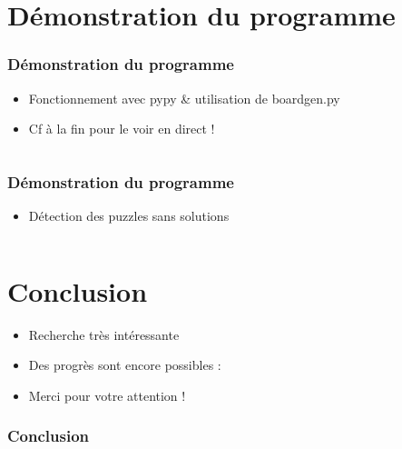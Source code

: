 \documentclass[12pt]{beamer}
\begin{document}
\section[]{Démonstration du programme}
\begin{frame}
\frametitle{Démonstration du programme}%
\begin{itemize}
    \item Fonctionnement avec pypy & utilisation de boardgen.py
    \item Cf à la fin pour le voir en direct !
\end{itemize}


\begin{columns}
\end{columns}
\end{frame}

\begin{frame}
\frametitle{Démonstration du programme}%

\begin{itemize}
    \item Détection des puzzles sans solutions
\end{itemize}


\begin{columns}
\end{columns}

\end{frame}




\section[]{Conclusion}
\begin{frame}
\begin{itemize}
    \item Recherche très intéressante
    \item Des progrès sont encore possibles :
    \item Merci pour votre attention !
\end{itemize}
\frametitle{Conclusion}


\end{frame}
\end{document}
